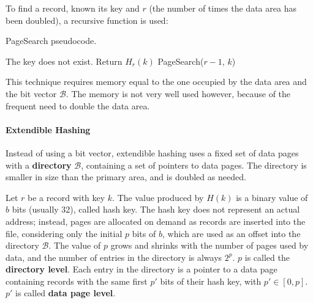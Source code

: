 To find a record, known its key and $r$ (the number of times the data area has been doubled), a recursive function is used:
\begin{algorithm}
\caption{PageSearch pseudocode.}
\begin{algorithmic}[1]
        \State The key does not exist.
        \State Return $H_r(k)$
    \Else
        \State PageSearch($r-1$, $k$)
    \EndIf
\end{algorithmic}
\end{algorithm}
This technique requires memory equal to the one occupied by the data area and the bit vector $\mathcal{B}$. The memory is not very well used however, because of the frequent need to double the data area.

\paragraph{Extendible Hashing}

Instead of using a bit vector, extendible hashing uses a fixed set of data pages with a \textbf{directory} $\mathcal{B}$, containing a set of pointers to data pages. The directory is smaller in size than the primary area, and is doubled as needed.

Let $r$ be a record with key $k$. The value produced by $H(k)$ is a binary value of $b$ bits (usually 32), called hash key. The hash key does not represent an actual address; instead, pages are allocated on demand as records are inserted into the file, considering only the initial $p$ bits of $b$, which are used as an offset into the directory $\mathcal{B}$. The value of $p$ grows and shrinks with the number of pages used by data, and the number of entries in the directory is always $2^p$. $p$ is called the \textbf{directory level}. Each entry in the directory is a pointer to a data page containing records with the same first $p'$ bits of their hash key, with $p' \in [0, p]$. $p'$ is called \textbf{data page level}.


